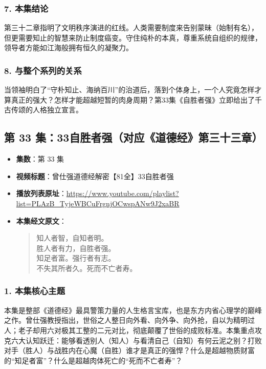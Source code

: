 \subsubsection{7. 本集结论}
第三十二章指明了文明秩序演进的红线。人类需要制度来告别蒙昧（始制有名），但更需要知止的智慧来防止制度癌变。守住纯朴的本真，尊重系统自组织的规律，领导者方能如江海般拥有恒久的凝聚力。

\subsubsection{8. 与整个系列的关系}
当领袖明白了“守朴知止、海纳百川”的治道后，落到个体身上，一个人究竟怎样才算真正的强大？怎样才能超越短暂的肉身周期？第33集《自胜者强》立即给出了千古传颂的人格独立宣言。

\clearpage

\subsection{第 33 集：33自胜者强（对应《道德经》第三十三章）}
\label{sec:ep33}

\begin{itemize}
    \item \textbf{集数}：第 33 集
    \item \textbf{视频标题}：曾仕强道德经解密【81全】33自胜者强
    \item \textbf{播放列表原址}：\url{https://www.youtube.com/playlist?list=PLAzB_TyjeWBCuFrgnjOCwspANw9J2xaBR}
    \item \textbf{本集经文原文}：
    \begin{quote}\kaishu
    知人者智，自知者明。\\
    胜人者有力，自胜者强。\\
    知足者富。强行者有志。\\
    不失其所者久。死而不亡者寿。
    \end{quote}
\end{itemize}

\subsubsection{1. 本集核心主题}
本集是整部《道德经》最具警策力量的人生格言宝库，也是东方内省心理学的巅峰之作。曾仕强教授指出，世俗之人整日向外看、向外争、向外抢，自以为精明过人；老子却用六对极其工整的二元对比，彻底颠覆了世俗的成败标准。本集重点攻克六大认知跃迁：能够看透别人（知人）与看清自己（自知）有何云泥之别？打败对手（胜人）与战胜内在心魔（自胜）谁才是真正的强悍？什么是超越物质财富的“知足者富”？什么是超越肉体死亡的“死而不亡者寿”？

